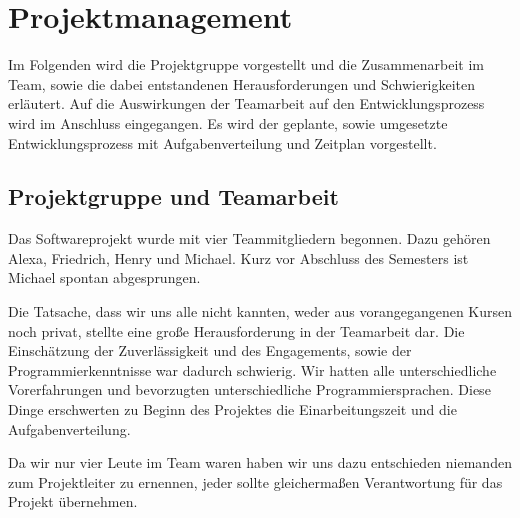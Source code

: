 \section{Projektmanagement}
\label{sec:projektmanagement}

Im Folgenden wird die Projektgruppe vorgestellt und die Zusammenarbeit im Team, sowie die dabei entstandenen Herausforderungen und Schwierigkeiten erläutert. Auf die Auswirkungen der Teamarbeit auf den Entwicklungsprozess wird im Anschluss eingegangen. Es wird der geplante, sowie umgesetzte Entwicklungsprozess mit Aufgabenverteilung und Zeitplan vorgestellt.

\subsection{Projektgruppe und Teamarbeit}
\label{subsec:teammitglieder}

Das Softwareprojekt wurde mit vier Teammitgliedern begonnen. Dazu gehören Alexa, Friedrich, Henry und Michael. Kurz vor Abschluss des Semesters ist Michael spontan abgesprungen.

Die Tatsache, dass wir uns alle nicht kannten, weder aus vorangegangenen Kursen noch privat, stellte eine große Herausforderung in der Teamarbeit dar. Die Einschätzung der Zuverlässigkeit und des Engagements, sowie der Programmierkenntnisse war dadurch schwierig. Wir hatten alle unterschiedliche Vorerfahrungen und bevorzugten unterschiedliche Programmiersprachen. Diese Dinge erschwerten zu Beginn des Projektes die Einarbeitungszeit und die Aufgabenverteilung.

Da wir nur vier Leute im Team waren haben wir uns dazu entschieden niemanden zum Projektleiter zu ernennen, jeder sollte gleichermaßen Verantwortung für das Projekt übernehmen.


